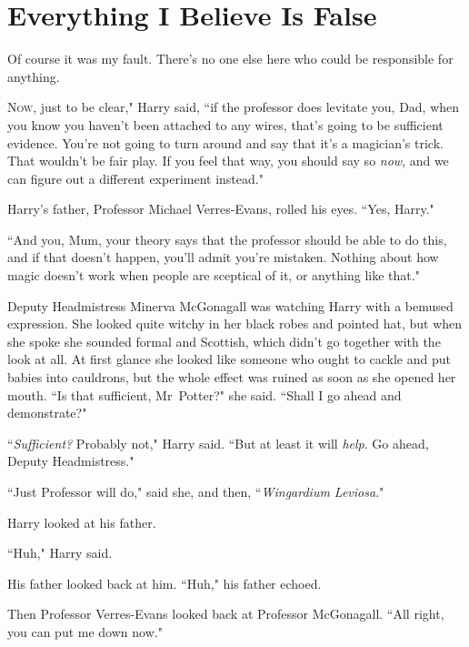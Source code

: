 \chapter{Everything I Believe Is False}

\begin{chapterOpeningQuote}
Of course it was my fault. There's no one else here who could be responsible for anything.
\end{chapterOpeningQuote}

\lettrine[ante=``]{N}{ow}, just to be clear," Harry said, ``if the professor does levitate you, Dad, when you know you haven't been attached to any wires, that's going to be sufficient evidence. You're not going to turn around and say that it's a magician's trick. That wouldn't be fair play. If you feel that way, you should say so \emph{now}, and we can figure out a different experiment instead."

Harry's father, Professor Michael Verres-Evans, rolled his eyes. ``Yes, Harry."

``And you, Mum, your theory says that the professor should be able to do this, and if that doesn't happen, you'll admit you're mistaken. Nothing about how magic doesn't work when people are sceptical of it, or anything like that."

Deputy Headmistress Minerva McGonagall was watching Harry with a bemused expression. She looked quite witchy in her black robes and pointed hat, but when she spoke she sounded formal and Scottish, which didn't go together with the look at all. At first glance she looked like someone who ought to cackle and put babies into cauldrons, but the whole effect was ruined as soon as she opened her mouth. ``Is that sufficient, Mr~Potter?" she said. ``Shall I go ahead and demonstrate?"

``\emph{Sufficient?} Probably not," Harry said. ``But at least it will \emph{help}. Go ahead, Deputy Headmistress."

``Just Professor will do," said she, and then, ``\emph{Wingardium Leviosa}."

Harry looked at his father.

``Huh," Harry said.

His father looked back at him. ``Huh," his father echoed.

Then Professor Verres-Evans looked back at Professor McGonagall. ``All right, you can put me down now."

